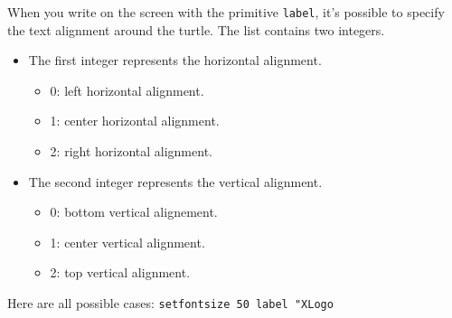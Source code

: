 When you write on the screen with the primitive \texttt{label}, it's possible to specify the text alignment around the turtle. The list contains two integers.
\begin{itemize}
 \item The first integer represents the horizontal alignment.
	\begin{itemize}
 	\item 0: left horizontal alignment.
	\item 1: center horizontal alignment.
	\item 2: right horizontal alignment.
	\end{itemize}
 \item The second integer represents the vertical alignment.
	\begin{itemize}
 	\item 0: bottom vertical alignement.
	\item 1: center vertical alignment.
	\item 2: top vertical alignment.
	\end{itemize}
\end{itemize}
Here are all possible cases:
\texttt{setfontsize 50 label "XLogo}
